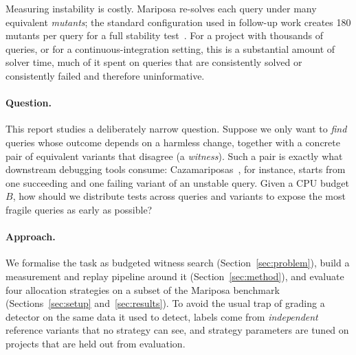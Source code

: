 \documentclass[11pt]{article}
\begin{document}
Measuring instability is costly. Mariposa re-solves each query under many equivalent \emph{mutants}; the standard configuration used in follow-up work creates 180 mutants per query for a full stability test~\cite{cazamariposas}. For a project with thousands of queries, or for a continuous-integration setting, this is a substantial amount of solver time, much of it spent on queries that are consistently solved or consistently failed and therefore uninformative.

\paragraph{Question.} This report studies a deliberately narrow question. Suppose we only want to \emph{find} queries whose outcome depends on a harmless change, together with a concrete pair of equivalent variants that disagree (a \emph{witness}). Such a pair is exactly what downstream debugging tools consume: Cazamariposas~\cite{cazamariposas}, for instance, starts from one succeeding and one failing variant of an unstable query. Given a CPU budget $B$, how should we distribute tests across queries and variants to expose the most fragile queries as early as possible?

\paragraph{Approach.} We formalise the task as budgeted witness search (Section~\ref{sec:problem}), build a measurement and replay pipeline around it (Section~\ref{sec:method}), and evaluate four allocation strategies on a subset of the Mariposa benchmark (Sections~\ref{sec:setup} and~\ref{sec:results}). To avoid the usual trap of grading a detector on the same data it used to detect, labels come from \emph{independent} reference variants that no strategy can see, and strategy parameters are tuned on projects that are held out from evaluation.
\end{document}
